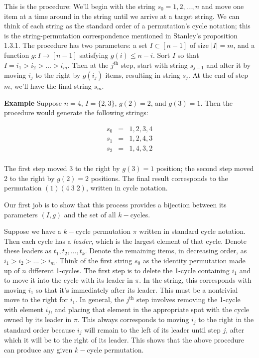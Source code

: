 \documentclass[]{article}
\begin{document}
This is the procedure: We'll begin with the string
\(s_0 = 1, 2, \ldots, n\) and move one item at a time around in the
string until we arrive at a target string. We can think of each string
as the standard order of a permutation's cycle notation; this is the
string-permutation correspondence mentioned in Stanley's proposition
1.3.1. The procedure has two parameters: a set \(I \subset [n-1]\) of
size \(|I| = m\), and a function \(g:I\to [n-1]\) satisfying
\(g(i) \le n - i\). Sort \(I\) so that \(I = i_1 > i_2 > \ldots > i_m\).
Then at the \(j^\text{th}\) step, start with string \(s_{j-1}\) and
alter it by moving \(i_j\) to the right by \(g(i_j)\) items, resulting
in string \(s_j\). At the end of step \(m\), we'll have the final string
\(s_m\).

\textbf{Example} Suppose \(n=4\), \(I=\{2,3\}\), \(g(2) = 2\), and
\(g(3) = 1\). Then the procedure would generate the following strings:

\[
\begin{array}{rcl}
s_0 & = & 1, 2, 3, 4 \\
s_1 & = & 1, 2, 4, 3 \\
s_2 & = & 1, 4, 3, 2 \\
\end{array}
\]

The first step moved 3 to the right by \(g(3)=1\) position; the second
step moved 2 to the right by \(g(2)=2\) positions. The final result
corresponds to the permutation \((1) (4\; 3\; 2)\), written in cycle
notation.

Our first job is to show that this process provides a bijection between
its parameters \((I, g)\) and the set of all \(k-\)cycles.

Suppose we have a \(k-\)cycle permutation \(\pi\) written in standard
cycle notation. Then each cycle has a \emph{leader}, which is the
largest element of that cycle. Denote these leaders as
\(t_1, t_2, \ldots, t_k\). Denote the remaining items, in decreasing
order, as \(i_1 > i_2 > \ldots > i_m\). Think of the first string
\(s_0\) as the identity permutation made up of \(n\) different 1-cycles.
The first step is to delete the 1-cycle containing \(i_1\) and to move
it into the cycle with its leader in \(\pi\). In the string, this
corresponds with moving \(i_1\) so that it's immediately after its
leader. This must be a nontrivial move to the right for \(i_1\). In
general, the \(j^\text{th}\) step involves removing the 1-cycle with
element \(i_j\), and placing that element in the appropriate spot with
the cycle owned by its leader in \(\pi\). This always corresponds to
moving \(i_j\) to the right in the standard order because \(i_j\) will
remain to the left of its leader until step \(j\), after which it will
be to the right of its leader. This shows that the above procedure can
produce any given \(k-\)cycle permutation.
\end{document}

